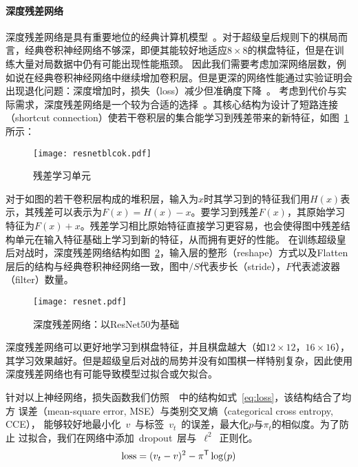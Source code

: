 \paragraph{深度残差网络}
深度残差网络是具有重要地位的经典计算机模型~\cite{resnet}。对于超级皇后规则下的棋局而言，经典卷积神经网络不够深，即便其能较好地适应$8\times8$的棋盘特征，但是在训练大量对局数据中仍有可能出现性能瓶颈。
因此我们需要考虑加深网络层数，例如说在经典卷积神经网络中继续增加卷积层。但是更深的网络性能通过实验证明会出现退化问题：深度增加时，损失（loss）减少但准确度下降~\cite{resnet,he2016identity}。
考虑到代价与实际需求，深度残差网络是一个较为合适的选择~\cite{resnet}。其核心结构为设计了短路连接（shortcut connection）使若干卷积层的集合能学习到残差带来的新特征，如图~\ref{fig:resunit}所示：
\begin{figure}[H]
    \centering
    \texttt{[image: resnetblcok.pdf]}
    \caption[resunit]{%
    残差学习单元~\cite{resnet}%
      }
    \label{fig:resunit}
\end{figure}
对于如图的若干卷积层构成的堆积层，输入为$x$时其学习到的特征我们用$H(x)$表示，其残差可以表示为$F(x)=H(x)-x$。要学习到残差$F(x)$，其原始学习特征为$F(x)+x$。残差学习相比原始特征直接学习更容易，也会使得图中残差结构单元在输入特征基础上学习到新的特征，从而拥有更好的性能。
在训练超级皇后对战时，深度残差网络结构如图~\ref{fig:res}，输入层的整形（reshape）方式以及Flatten层后的结构与经典卷积神经网络一致，图中$/S$代表步长（stride），$F$代表滤波器（filter）数量。
\begin{figure}[H]
    \centering
    \texttt{[image: resnet.pdf]}
    \caption[res]{%
    深度残差网络：以ResNet50为基础~\cite{resnet}%
      }
    \label{fig:res}
\end{figure}
深度残差网络可以更好地学习到棋盘特征，并且棋盘越大（如$12\times12$，$16\times16$），其学习效果越好。但是超级皇后对战的局势并没有如围棋一样特别复杂，因此使用深度残差网络也有可能导致模型过拟合或欠拟合。

针对以上神经网络，损失函数我们仿照~\cite{Silver2017}~中的结构如式~\eqref{eq:loss}，该结构结合了均方
误差（mean-square error, MSE）与类别交叉熵（categorical cross entropy, CCE），
能够较好地最小化~$v$~与标签~$v_{t}$~的误差，最大化$p$与$\pi_{t}$的相似度。为了防止
过拟合，我们在网络中添加~dropout~层与~$\ell^2$~正则化。
\begin{equation}
    \text{loss} = (v_{t}-v)^{2} - \pi^{\mathsf T}\log(p)
    \label{eq:loss}
\end{equation}

